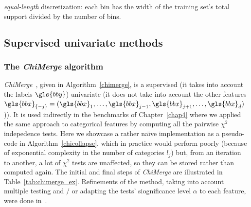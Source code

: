\begin{algorithm}[H]
 \KwResult{$\hat{\q}$}
 \For{$j=1$ to $d$}{
Let $w_j = \max_{i} x_{i,j} - \min_{i} x_{i,j}$\;
Let $c_0=-\infty$, $c_{m_j} = + \infty$ and $c_{j,h} = \frac{w_j \cdot h}{m_j} + \min_{i} x_{i,j}$\;
Let $C_{j,h} = ]c_{j,h-1};c_{j,h}]$ and $\hat{\q}_j(\cdot) = (\hat{q}_{j,h}(\cdot))_1^{m_j}$\;
Set $\hat{q}_{j,h}(\cdot)=\mathds{1}_{C_{j,h}}(\cdot)$.
}
 \caption{\label{equal-length-disc} \textit{equal-length} discretization: each bin has the width of the training set's total support divided by the number of bins.}
\end{algorithm}



\subsection{Supervised univariate methods}

\subsubsection{The \textit{ChiMerge} algorithm}

\textit{ChiMerge}~\cite{kerber1992chimerge}, given in Algorithm~\ref{chimerge}, is a supervised (it takes into account the labels $\gls{bby}$) univariate (it does not take into account the other features $\gls{bbx}_{\{-j\}} = (\gls{bbx}_1, \dots, \gls{bbx}_{j-1}, \gls{bbx}_{j+1}, \dots, \gls{bbx}_d)$)). It is used indirectly in the benchmarks of Chapter~\ref{chap4} where we applied the same approach to categorical features by computing all the pairwise $\chi^2$ indepedence tests. Here we showcase a rather na\"{\i}ve implementation as a pseudo-code in Algorithm~\ref{chicollapse}, which in practice would perform poorly (because of exponential complexity in the number of categories $l_j$) but, from an iteration to another, a lot of $\chi^2$ tests are unaffected, so they can be stored rather than computed again. The initial and final steps of \textit{ChiMerge} are illustrated in Table~\ref{tab:chimerge_ex}. Refinements of the method, taking into account multiple testing and / or adapting the tests' siognificance level $\alpha$ to each feature, were done in~\cite{liu1995chi2,wang1998concurrent,tay2002modified,su2005extended}.

